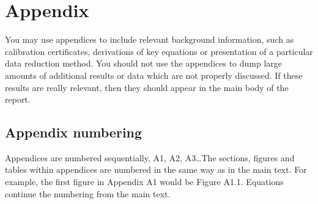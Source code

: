 \chapter{Appendix}
You may use appendices to include relevant background information, such as calibration certificates, derivations of key equations or presentation of a particular data reduction method. You should not use the appendices to dump large amounts of additional results or data which are not properly discussed. If these results are really relevant, then they should appear in the main body of the report.

\section{Appendix numbering}
Appendices are numbered sequentially, A1, A2, A3\ldots The sections, figures and tables within appendices are numbered in the same way as in the main text. For example, the first figure in Appendix A1 would be Figure A1.1. Equations continue the numbering from the main text.

